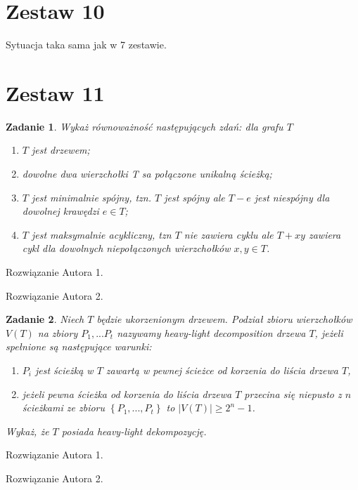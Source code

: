 \documentclass{mwart}
\newtheorem{zad}{Zadanie}[section]
\begin{document}
\newpage
\section{Zestaw 10}          %
Sytuacja taka sama jak w 7 zestawie.












\newpage
\section{Zestaw 11}          %

\begin{zad}
    Wykaż równoważność następujących zdań: dla grafu $T$
    \begin{enumerate}
        \item $T$ jest drzewem;
        \item dowolne dwa wierzchołki T sa połączone unikalną ścieżką;
        \item $T$ jest minimalnie spójny, tzn. $T$ jest spójny ale $T - e$ jest niespójny dla dowolnej krawędzi $e \in T$;
        \item $T$ jest maksymalnie acykliczny, tzn $T$ nie zawiera cyklu ale $T+ xy$ zawiera cykl dla dowolnych niepołączonych wierzchołków $x,y \in T$.
    \end{enumerate}
\end{zad}\begin{mdframed}
    Rozwiązanie Autora 1.
\end{mdframed}
\begin{mdframed}
    Rozwiązanie Autora 2.
\end{mdframed}


\begin{zad}
    Niech $T$ będzie ukorzenionym drzewem. Podział zbioru wierzchołków $V(T)$ na zbiory $P_1, ... P_t$ nazywamy
    heavy-light decomposition drzewa $T$, jeżeli spełnione są następujące warunki:
    \begin{enumerate}
        \item  $P_i$ jest ścieżką w $T$ zawartą w pewnej ścieżce od korzenia do liścia drzewa $T$,
        \item  jeżeli pewna ścieżka od korzenia do liścia drzewa $T$ przecina się niepusto z $n$ ścieżkami
              ze zbioru $\left\{P_1, ..., P_t\right\}$ to $|V(T)| \geq 2^n-1$.
    \end{enumerate}
    Wykaż, że $T$ posiada heavy-light dekompozycję.
\end{zad}
\begin{mdframed}
    Rozwiązanie Autora 1.
\end{mdframed}
\begin{mdframed}
    Rozwiązanie Autora 2.
\end{mdframed}
\end{document}
